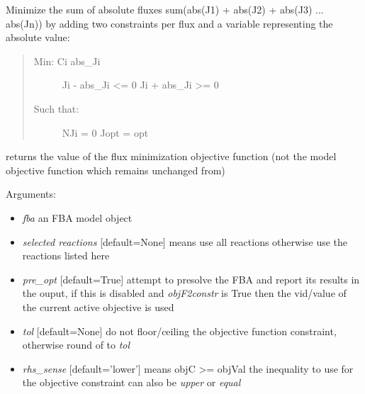 \documentclass[a4paper,11pt,english]{sphinxmanual}
\begin{document}
\begin{fulllineitems}
\label{modules_doc:cbmpy.CBGLPK.glpk_MinimizeSumOfAbsFluxes}
Minimize the sum of absolute fluxes sum(abs(J1) + abs(J2) + abs(J3) ... abs(Jn)) by adding two constraints per flux
and a variable representing the absolute value:
\begin{quote}
\begin{description}
\item[{Min: Ci abs\_Ji}] \leavevmode
Ji - abs\_Ji \textless{}= 0
Ji + abs\_Ji \textgreater{}= 0

\item[{Such that:}] \leavevmode
NJi = 0
Jopt = opt

\end{description}
\end{quote}

returns the value of the flux minimization objective function (not the model objective function which remains unchanged from)

Arguments:
\begin{itemize}
\item {} 
\emph{fba} an FBA model object

\item {} 
\emph{selected reactions} {[}default=None{]} means use all reactions otherwise use the reactions listed here

\item {} 
\emph{pre\_opt} {[}default=True{]} attempt to presolve the FBA and report its results in the ouput, if this is disabled and \emph{objF2constr} is True then the vid/value of the current active objective is used

\item {} 
\emph{tol}  {[}default=None{]} do not floor/ceiling the objective function constraint, otherwise round of to \emph{tol}

\item {} 
\emph{rhs\_sense} {[}default='lower'{]} means objC \textgreater{}= objVal the inequality to use for the objective constraint can also be \emph{upper} or \emph{equal}


\end{itemize}
\end{fulllineitems}
\end{document}
